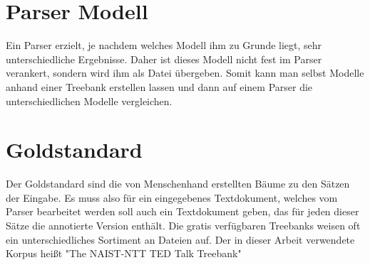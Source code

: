 \section{Parser Modell}
Ein Parser erzielt, je nachdem welches Modell ihm zu Grunde liegt, sehr unterschiedliche Ergebnisse. Daher ist dieses Modell nicht fest im Parser verankert, sondern wird ihm als Datei übergeben. Somit kann man selbst Modelle anhand einer Treebank erstellen lassen und dann auf einem Parser die unterschiedlichen Modelle vergleichen. %

\section{Goldstandard}
Der Goldstandard sind die von Menschenhand erstellten Bäume zu den Sätzen der Eingabe. Es muss also für ein eingegebenes Textdokument, welches vom Parser bearbeitet werden soll auch ein Textdokument geben, das für jeden dieser Sätze die annotierte Version enthält. Die gratis verfügbaren Treebanks weisen oft ein unterschiedliches Sortiment an Dateien auf. Der in dieser Arbeit verwendete Korpus heißt "The NAIST-NTT TED Talk Treebank" %